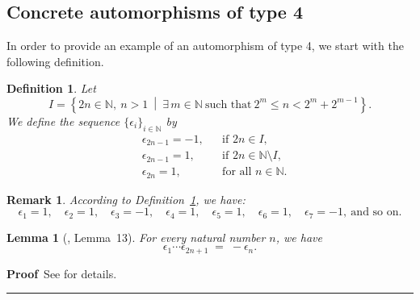 \documentclass{article}
\newtheorem{lemma}[theorem]{Lemma}
\newtheorem{definition}[theorem]{Definition}
\newtheorem{remark}[theorem]{Remark}
\newenvironment{proof}[1][Proof]{\noindent\textbf{#1\,} }{\hfill \rule{0.5em}{0.5em}\medskip}
\begin{document}
	
	
	
	
	
	
	
	
	
	
	
	
	
	
	
	
	
	
	
	
	
	
	
	\subsection{Concrete automorphisms of type 4}
	
	
	In order to provide an example of an automorphism of type 4, we start with the following definition.
	
	\begin{definition}\label{def epsilon}
		Let
		\[
		I = \left\{ 2n \in \mathbb{N},\ n > 1 \ \middle|\ \exists\, m \in \mathbb{N} \ \text{such that} \ 2^{m} \leq n < 2^{m} + 2^{m-1} \right\}.
		\]
		We define the sequence $\{\epsilon_i\}_{i \in \mathbb{N}}$ by
		\[
		\begin{aligned}
			&\epsilon_{2n-1} = -1, && \text{if } 2n \in I,\\
			&\epsilon_{2n-1} = 1, && \text{if } 2n \in \mathbb{N} \setminus I,\\
			&\epsilon_{2n} = 1, && \text{for all } n \in \mathbb{N}.
		\end{aligned}
		\]
	\end{definition}
	
	\begin{remark}\label{ex epsilon}
		According to Definition~\ref{def epsilon}, we have:
		\[
		\epsilon_{1} = 1,\quad \epsilon_{2} = 1,\quad \epsilon_{3} = -1,\quad \epsilon_{4} = 1,\quad \epsilon_{5} = 1,\quad \epsilon_{6} = 1,\quad \epsilon_{7} = -1, \ \text{and so on}.
		\]
	\end{remark}
	
	
	
	
	\begin{lemma}[\cite{anagomes}, Lemma~13]\label{lemma epsilon}
		For every natural number $n$, we have
		\[
		\epsilon_{1} \cdots \epsilon_{2n+1} \;=\; -\epsilon_{n}.
		\]
	\end{lemma}
	
	\begin{proof}
		See \cite[ Lemma~13]{anagomes} for details.
	\end{proof}
	
\end{document}

